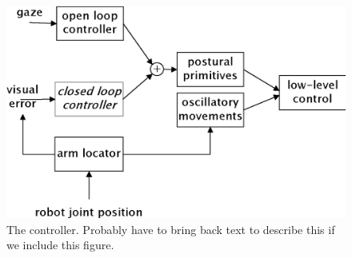\ifverbose
\begin{figure}[tbh]
\begin{center}
\includegraphics[width=\columnwidth]{control-flow.eps}
\caption{ 
\label{fig:control-flow}
%
  The controller.  Probably have to bring back text to describe this
  if we include this figure.
%
}
\end{center}
\end{figure}
\fi

